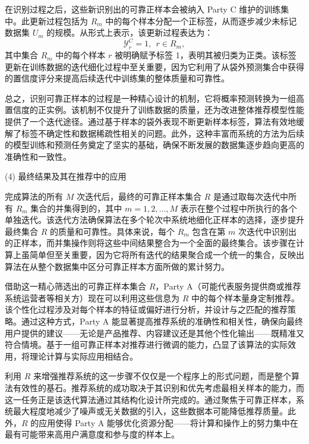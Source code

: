 在识别过程之后，这些新识别出的可靠正样本会被纳入 Party C 维护的训练集中。此更新过程包括为 ${{R}_{m}}$ 中的每个样本分配一个正标签，从而逐步减少未标记数据集 ${{U}_{m}}$ 的规模。从形式上表示，该更新过程表达为：
\begin{equation}
	\mathsf{\mathcal{Y}}_{r}^{C}=1,\ \ r\in {{R}_{m}},
\end{equation}
其中集合 ${{R}_{m}}$ 中的每个样本 $r$ 被明确赋予标签 1，表明其被归类为正类。该标签更新在训练数据的迭代细化过程中至关重要，因为它利用了从袋外预测集合中获得的置信度评分来提高后续迭代中训练集的整体质量和可靠性。

总之，识别可靠正样本的过程是一种精心设计的机制，它将概率预测转换为一组高置信度的正实例。该机制不仅提升了训练数据的质量，还为改进整体推荐模型性能提供了一个迭代途径。通过基于样本的袋外表现不断更新样本标签，算法有效地缓解了标签不确定性和数据稀疏性相关的问题。此外，这种丰富而系统的方法为后续的模型训练和预测任务奠定了坚实的基础，确保不断发展的数据集逐步趋向更高的准确性和一致性。 

(4) 最终结果及其在推荐中的应用

完成算法的所有 $M$ 次迭代后，最终的可靠正样本集合 $R$ 是通过取每次迭代中所有 ${{R}_{m}}$ 集合的并集得到的，其中 $m = 1, 2, \dots, M$ 表示在整个过程中所执行的各个单独迭代。该迭代方法确保算法在多个轮次中系统地细化正样本的选择，逐步提升最终集合 $R$ 的质量和可靠性。具体来说，每个 ${{R}_{m}}$ 包含在第 $m$ 次迭代中识别出的正样本，而并集操作则将这些中间结果整合为一个全面的最终集合。该步骤在计算上虽简单但至关重要，因为它将所有迭代的结果聚合成一个统一的集合，反映出算法在从整个数据集中区分可靠正样本方面所做的累计努力。

借助这一精心筛选出的可靠正样本集合 $R$，Party A（可能代表服务提供商或推荐系统运营者等相关方）现在可以利用这些信息为 $R$ 中的每个样本量身定制推荐。该个性化过程涉及对每个样本的特征或偏好进行分析，并设计与之匹配的推荐策略。通过这种方式，Party A 能显著提高推荐系统的准确性和相关性，确保向最终用户提供的建议——无论是产品推荐、内容建议还是其他个性化输出——既精准又符合情境。基于一组可靠正样本对推荐进行微调的能力，凸显了该算法的实际效用，将理论计算与实际应用相结合。

利用 $R$ 来增强推荐系统的这一步骤不仅仅是一个程序上的形式问题，而是整个算法有效性的基石。推荐系统的成功取决于其识别和优先考虑最相关样本的能力，而这一任务正是该迭代算法通过其结构化设计所完成的。通过聚焦于可靠正样本，系统最大程度地减少了噪声或无关数据的引入，这些数据本可能降低推荐质量。此外，$R$ 的应用使得 Party A 能够优化资源分配——将计算和操作上的努力集中在最有可能带来高用户满意度和参与度的样本上。

